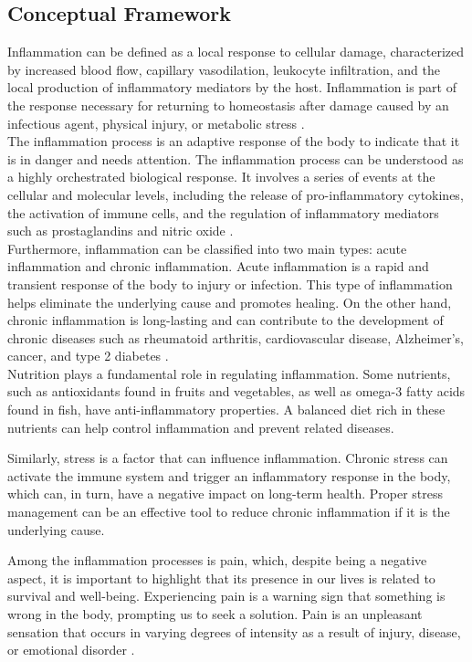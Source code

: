 \documentclass[jou]{apa7}
\begin{document}
	\subsection{Conceptual Framework}
	Inflammation can be defined as a local response to cellular damage, characterized by increased blood flow, capillary vasodilation, leukocyte infiltration, and the local production of inflammatory mediators by the host. Inflammation is part of the response necessary for returning to homeostasis after damage caused by an infectious agent, physical injury, or metabolic stress \parencite{GarciaCasal2014}.\\

	The inflammation process is an adaptive response of the body to indicate that it is in danger and needs attention. The inflammation process can be understood as a highly orchestrated biological response. It involves a series of events at the cellular and molecular levels, including the release of pro-inflammatory cytokines, the activation of immune cells, and the regulation of inflammatory mediators such as prostaglandins and nitric oxide \parencite{Stankov2012}.\\

	Furthermore, inflammation can be classified into two main types: acute inflammation and chronic inflammation. Acute inflammation is a rapid and transient response of the body to injury or infection. This type of inflammation helps eliminate the underlying cause and promotes healing. On the other hand, chronic inflammation is long-lasting and can contribute to the development of chronic diseases such as rheumatoid arthritis, cardiovascular disease, Alzheimer's, cancer, and type 2 diabetes \parencite{Osimo2019}.\\

	Nutrition plays a fundamental role in regulating inflammation. Some nutrients, such as antioxidants found in fruits and vegetables, as well as omega-3 fatty acids found in fish, have anti-inflammatory properties. A balanced diet rich in these nutrients can help control inflammation and prevent related diseases.

	Similarly, stress is a factor that can influence inflammation. Chronic stress can activate the immune system and trigger an inflammatory response in the body, which can, in turn, have a negative impact on long-term health. Proper stress management can be an effective tool to reduce chronic inflammation if it is the underlying cause.

	Among the inflammation processes is pain, which, despite being a negative aspect, it is important to highlight that its presence in our lives is related to survival and well-being. Experiencing pain is a warning sign that something is wrong in the body, prompting us to seek a solution. Pain is an unpleasant sensation that occurs in varying degrees of intensity as a result of injury, disease, or emotional disorder \parencite{Farlex2023}.
\end{document}
